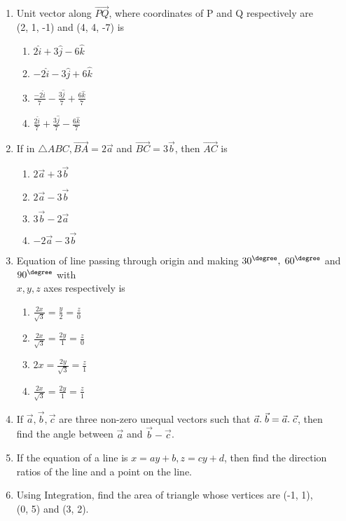 \documentclass{article}
\begin{document}
\begin{enumerate}
	\item  Unit vector along $ \overrightarrow{PQ} $, where coordinates of P and Q respectively are\\ (2, 1, -1) and (4, 4, -7) is
			\begin{enumerate}
				\item $ 2\hat{i}+3\hat{j}-6\hat{k} $
				\item $ -2\hat{i}-3\hat{j}+6\hat{k} $	
				\item $ \frac{-2\hat{i}}{7}-\frac{3\hat{j}}{7}+\frac{6\hat{k}}{7} $
				\item $ \frac{2\hat{i}}{7}+\frac{3\hat{j}}{7}-\frac{6\hat{k}}{7} $
			\end{enumerate}
	\item If in $ \triangle ABC, \overrightarrow{BA} = 2 \vec{a} $ and $ \overrightarrow{BC} = 3 \vec{b} $, then $ \overrightarrow{AC} $ is
		\begin{enumerate}
			\item $2\vec{a} + 3\vec{b}$
			\item $2\vec{a} - 3\vec{b}$
			\item $3\vec{b} - 2\vec{a}$
			\item $-2\vec{a} - 3\vec{b}$
		\end{enumerate}
	\item Equation of line passing through origin and making $ 30^{\degree},\hspace{1mm}60^{\degree} $ and $ 90^{\degree} $ with\\$x, y, z$ axes respectively is
			\begin{enumerate}
				\item $ \frac{2x}{\sqrt{3}} = \frac{y}{2} = \frac{z}{0} $
				\item $ \frac{2x}{\sqrt{3}} = \frac{2y}{1} = \frac{z}{0} $
				\item $ 2x = \frac{2y}{\sqrt{3}} = \frac{z}{1} $
				\item $ \frac{2x}{\sqrt{3}} = \frac{2y}{1} = \frac{z}{1} $
			\end{enumerate}
		\item If $ \vec{a}, \vec{b}, \vec{c} $ are three non-zero unequal vectors such that $ \vec{a}.\hspace{1mm}\vec{b} = \vec{a}.\hspace{1mm}\vec{c} $, then\\find the angle between $ \vec{a} $ and $ \vec{b} - \vec{c} $.
	\item If the equation of a line is $ x = ay + b, z = cy + d $, then find the direction\\ratios of the line and a point on the line.
	\item Using Integration, find the area of triangle whose vertices are (-1, 1),\\(0, 5) and (3, 2).
\end{enumerate}
\end{document}
